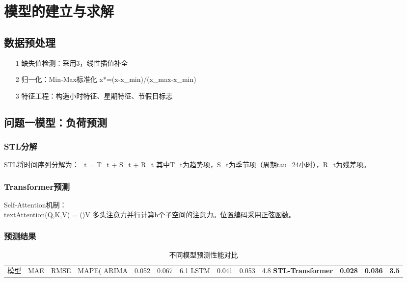\newpage
\section{模型的建立与求解}

\subsection{数据预处理}
\begin{enumerate}[label=(\arabic*), itemindent=0pt, labelindent=\parindent, labelwidth=2em, labelsep=5pt, leftmargin=*]
\item[1] 缺失值检测：采用3，线性插值补全
\item[2] 归一化：Min-Max标准化 x*=(x-x_min)/(x_max-x_min)
\item[3] 特征工程：构造小时特征、星期特征、节假日标志
\end{enumerate}

\subsection{问题一模型：负荷预测}
\subsubsection{STL分解}
STL将时间序列分解为：\F_t = T_t + S_t + R_t
其中T_t为趋势项，S_t为季节项（周期tau=24小时），R_t为残差项。

\subsubsection{Transformer预测}
Self-Attention机制：\\text{Attention}(Q,K,V) = ()V
多头注意力并行计算h个子空间的注意力。位置编码采用正弦函数。

\subsubsection{预测结果}
\begin{table}[H]
\centering
\caption{不同模型预测性能对比}
\begin{tabular}{c c c c}
\toprule
模型 & MAE & RMSE & MAPE(%
\midrule
ARIMA & 0.052 & 0.067 & 6.1 
LSTM & 0.041 & 0.053 & 4.8 
\textbf{STL-Transformer} & \textbf{0.028} & \textbf{0.036} & \textbf{3.5} 
\bottomrule
\end{tabular}
\end{table}

